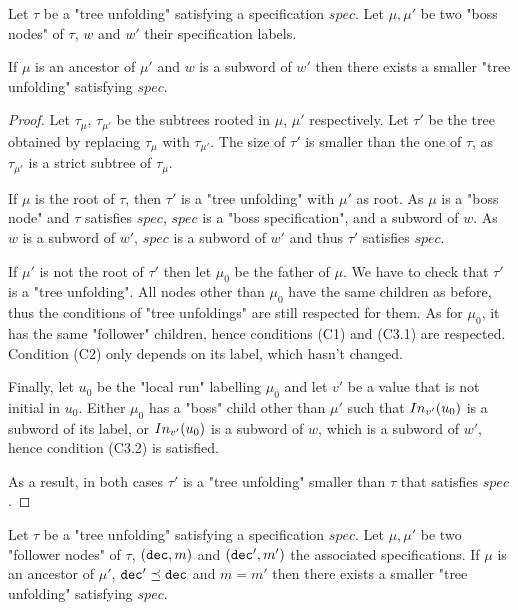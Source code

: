 \begin{lemma}
	Let $\tau$ be a "tree unfolding" satisfying a specification $spec$.
	Let $\mu, \mu'$ be two "boss nodes" of $\tau$, $w$ and $w'$ their specification labels.
	
	If $\mu$ is an ancestor of $\mu'$ and $w$ is a subword of $w'$ then there exists a smaller "tree unfolding" satisfying $spec$.  
\end{lemma}

\begin{proof}
	Let $\tau_{\mu}$, $\tau_{\mu'}$ be the subtrees rooted in $\mu$, $\mu'$ respectively. 
	Let $\tau'$ be the tree obtained by replacing $\tau_{\mu}$ with $\tau_{\mu'}$. The size of $\tau'$ is smaller than the one of $\tau$, as $\tau_{\mu'}$ is a strict subtree of $\tau_{\mu}$.
	
	If $\mu$ is the root of $\tau$, then $\tau'$ is a "tree unfolding" with $\mu'$ as root. As $\mu$ is a "boss node" and $\tau$ satisfies $spec$, $spec$ is a "boss specification", and a subword of $w$. 
	As $w$ is a subword of $w'$, $spec$ is a subword of $w'$ and thus $\tau'$ satisfies $spec$.
	
	If  $\mu'$ is not the root of $\tau'$ then let $\mu_0$ be the father of $\mu$. We have to check that $\tau'$ is a "tree unfolding". 
	All nodes other than $\mu_0$ have the same children as before, thus the conditions of "tree unfoldings" are still respected for them.
	As for $\mu_0$, it has the same "follower" children, hence conditions (C1) and (C3.1) are respected. Condition (C2) only depends on its label, which hasn't changed.
	
	Finally, let $u_0$ be the "local run" labelling $\mu_0$ and let $v'$ be a value that is not initial in $u_0$. Either $\mu_0$ has a "boss" child other than $\mu'$ such that $In_{v'}(u_0)$ is a subword of its label, or $In_{v'}(u_0)$ is a subword of $w$, which is a subword of $w'$, hence condition (C3.2) is satisfied. 
	
	As a result, in both cases $\tau'$ is a "tree unfolding" smaller than $\tau$ that satisfies $spec$. 
\end{proof}

\begin{lemma}
	Let $\tau$ be a "tree unfolding" satisfying a specification $spec$.
	Let $\mu, \mu'$ be two "follower nodes" of $\tau$, $(\mathtt{dec},m)$ and $(\mathtt{dec}',m')$ the associated specifications.
	If $\mu$ is an ancestor of $\mu'$, $\mathtt{dec}' \preceq \mathtt{dec}$ and $m=m'$ then there exists a smaller "tree unfolding" satisfying $spec$.  
\end{lemma}

